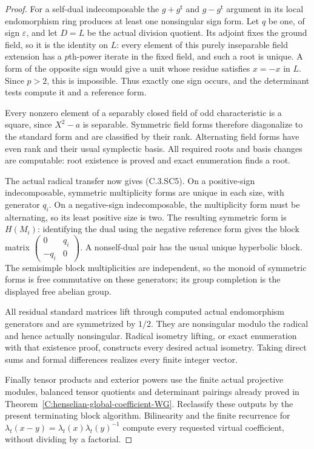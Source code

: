 \begin{proof}
For a self-dual indecomposable
the $g+g^{\mathsf t}$ and
$g-g^{\mathsf t}$ argument
in its local endomorphism
ring produces at least one
nonsingular sign form.
Let $q$ be one, of sign
$\varepsilon$, and let $D=L$
be the actual division quotient.
Its adjoint fixes the ground
field, so it is the identity
on $L$: every element of
this purely inseparable field
extension has a $p$th-power
iterate in the fixed field,
and such a root is unique.
A form of the opposite sign
would give a unit whose residue
satisfies $x=-x$ in $L$.
Since $p>2$, this is impossible.
Thus exactly one sign occurs,
and the determinant tests
compute it and a reference form.

Every nonzero element of a
separably closed field of odd
characteristic is a square,
since $X^2-a$ is separable.
Symmetric field forms therefore
diagonalize to the standard
form and are classified by
their rank.  Alternating field
forms have even rank and
their usual symplectic basis.
All required roots and basis
changes are computable: root
existence is proved and exact
enumeration finds a root.

The actual radical transfer
now gives (C.3.SC5).
On a positive-sign indecomposable,
symmetric multiplicity forms
are unique in each size, with
generator $q_i$.
On a negative-sign indecomposable,
the multiplicity form must be
alternating, so its least
positive size is two.
The resulting symmetric form
is $H(M_i)$: identifying the
dual using the negative reference
form gives the block matrix
$\left(\begin{smallmatrix}0&q_i\\-q_i&0\end{smallmatrix}\right)$.
A nonself-dual pair has the
usual unique hyperbolic block.
The semisimple block multiplicities
are independent, so the monoid
of symmetric forms is free
commutative on these generators;
its group completion is the
displayed free abelian group.

All residual standard matrices
lift through computed actual
endomorphism generators and
are symmetrized by $1/2$.
They are nonsingular modulo
the radical and hence actually
nonsingular.  Radical isometry
lifting, or exact enumeration
with that existence proof,
constructs every desired actual
isometry.
Taking direct sums and formal
differences realizes every
finite integer vector.

Finally tensor products and
exterior powers use the finite
actual projective modules,
balanced tensor quotients and
determinant pairings already
proved in
Theorem~\ref{C:henselian-global-coefficient-WG}.
Reclassify these outputs by
the present terminating block
algorithm.  Bilinearity and
the finite recurrence for
$\lambda_t(x-y)=\lambda_t(x)\lambda_t(y)^{-1}$
compute every requested virtual
coefficient, without dividing
by a factorial.
\end{proof}

